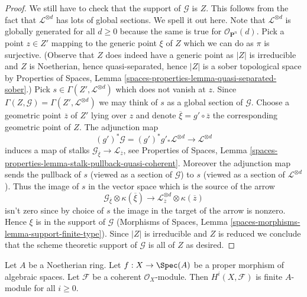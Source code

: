\begin{proof}
\medskip\noindent
We still have to check that the support of $\mathcal{G}$ is $Z$.
This follows from the fact that $\mathcal{L}^{\otimes d}$ has
lots of global sections. We spell it out here.
Note that $\mathcal{L}^{\otimes d}$ is globally generated for all $d \geq 0$
because the same is true for $\mathcal{O}_{\mathbf{P}^n}(d)$.
Pick a point $z \in Z'$ mapping to the generic point $\xi$ of $Z$
which we can do as $\pi$ is surjective.
(Observe that $Z$ does indeed have a generic point as $|Z|$ is irreducible
and $Z$ is Noetherian, hence quasi-separated, hence $|Z|$ is a sober
topological space by
Properties of Spaces, Lemma
\ref{spaces-properties-lemma-quasi-separated-sober}.)
Pick $s \in \Gamma(Z', \mathcal{L}^{\otimes d})$ which does not vanish at $z$.
Since $\Gamma(Z, \mathcal{G}) = \Gamma(Z', \mathcal{L}^{\otimes d})$
we may think of $s$ as a global section of $\mathcal{G}$.
Choose a geometric point $\overline{z}$ of $Z'$ lying over $z$
and denote $\overline{\xi} = g' \circ \overline{z}$
the corresponding geometric point of $Z$. The adjunction map
$$
(g')^*\mathcal{G} =
(g')^*g'_*\mathcal{L}^{\otimes d} \longrightarrow \mathcal{L}^{\otimes d}
$$
induces a map of stalks
$\mathcal{G}_{\overline{\xi}} \to \mathcal{L}_{\overline{z}}$, see
Properties of Spaces, Lemma
\ref{spaces-properties-lemma-stalk-pullback-quasi-coherent}.
Moreover the adjunction map sends the pullback of $s$ (viewed as a section
of $\mathcal{G}$) to $s$ (viewed as a section of $\mathcal{L}^{\otimes d}$).
Thus the image of $s$ in the vector space which is the source of the arrow
$$
\mathcal{G}_{\overline{\xi}} \otimes \kappa(\overline{\xi})
\longrightarrow
\mathcal{L}^{\otimes d}_{\overline{z}} \otimes \kappa(\overline{z})
$$
isn't zero since by choice of $s$ the image in the target of the arrow
is nonzero. Hence $\xi$ is in the support of $\mathcal{G}$
(Morphisms of Spaces, Lemma \ref{spaces-morphisms-lemma-support-finite-type}).
Since $|Z|$ is irreducible and $Z$ is reduced we conclude that
the scheme theoretic support of $\mathcal{G}$ is all of $Z$ as desired.
\end{proof}

\begin{lemma}
\label{lemma-proper-over-affine-cohomology-finite}
Let $A$ be a Noetherian ring.
Let $f : X \to \Spec(A)$ be a proper morphism of algebraic spaces.
Let $\mathcal{F}$ be a coherent $\mathcal{O}_X$-module.
Then $H^i(X, \mathcal{F})$ is finite $A$-module for all $i \geq 0$.
\end{lemma}

